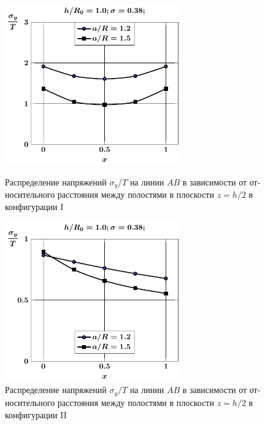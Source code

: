 \begin{russian}
\begin{figure}
\centering\footnotesize
\parbox[b]{7.5cm}{\centering\includegraphics[width=7.5cm]{cav2-a-h10-r10-z1-sig_y.pdf}
\caption{Распределение напряжений $\sigma_y/T$ на линии $AB$ в зависимости от относительного расстояния между полостями в плоскости $z=h/2$ в конфигурации I
\label{f:7:91}}}\hfil\hfil
\parbox[b]{7.5cm}{\centering\includegraphics[width=7.5cm]{cav2a-a-h10-r10-z1-sig_y.pdf}
\caption{Распределение напряжений $\sigma_y/T$ на линии $AB$ в зависимости от относительного расстояния между полостями в плоскости $z=h/2$ в конфигурации II
\label{f:7:92}}}
\end{figure}


\end{russian}
